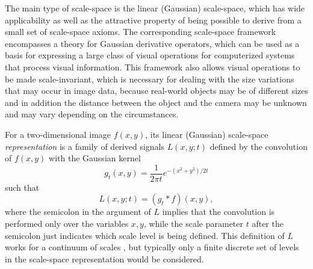 The main type of scale-space is the linear (Gaussian) scale-space, which has wide applicability as well as the attractive property of being possible to derive from a small set of scale-space axioms. The corresponding scale-space framework encompasses a theory for Gaussian derivative operators, which can be used as a basis for expressing a large class of visual operations for computerized systems that process visual information. This framework also allows visual operations to be made scale-invariant, which is necessary for dealing with the size variations that may occur in image data, because real-world objects may be of different sizes and in addition the distance between the object and the camera may be unknown and may vary depending on the circumstances.

For a two-dimensional image $f(x,y)$, its linear (Gaussian) scale-space \emph{representation} is a family of derived signals $L(x,y; t)$ defined by the convolution of $f(x,y)$ with the Gaussian kernel
\begin{equation}
g_t(x,y) = \frac{1}{2\pi t}e^{-(x^2 + y^2)/2t}
\end{equation}
such that
\begin{equation}
L(x,y; t) = (g_t * f)(x,y),
\end{equation}
where the semicolon in the argument of $L$ implies that the convolution is performed only over the variables $x,y$, while the scale parameter $t$ after the semicolon just indicates which scale level is being defined. This definition of $L$ works for a continuum of scales , but typically only a finite discrete set of levels in the scale-space representation would be considered.

